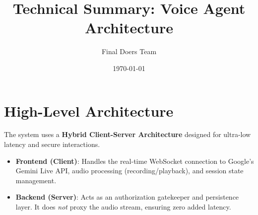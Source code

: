 \documentclass{article}
\title{Technical Summary: Voice Agent Architecture}
\author{Final Doers Team}
\date{\today}
\begin{document}
\maketitle

\section{High-Level Architecture}
The system uses a \textbf{Hybrid Client-Server Architecture} designed for ultra-low latency and secure interactions.

\begin{itemize}
    \item \textbf{Frontend (Client)}: Handles the real-time WebSocket connection to Google's Gemini Live API, audio processing (recording/playback), and session state management.
    \item \textbf{Backend (Server)}: Acts as an authorization gatekeeper and persistence layer. It does \textit{not} proxy the audio stream, ensuring zero added latency.
\end{itemize}
\end{document}
